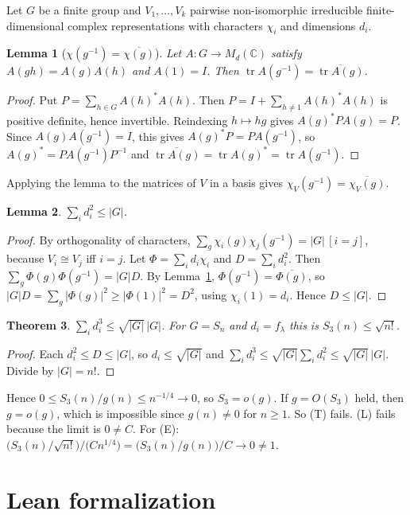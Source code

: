 \documentclass[11pt]{article}
\newtheorem{theorem}{Theorem}
\newtheorem{lemma}[theorem]{Lemma}
\theoremstyle{definition}
\newcommand{\tr}{\operatorname{tr}}
\begin{document}
Let $G$ be a finite group and $V_1,\dots,V_k$ pairwise non-isomorphic irreducible
finite-dimensional complex representations with characters $\chi_i$ and dimensions $d_i$.

\begin{lemma}[$\chi(g^{-1})=\overline{\chi(g)}$]\label{lem:conj}
Let $A:G\to M_d(\mathbb C)$ satisfy $A(gh)=A(g)A(h)$ and $A(1)=I$. Then
$\tr A(g^{-1})=\overline{\tr A(g)}$.
\end{lemma}
\begin{proof}
Put $P=\sum_{h\in G}A(h)^*A(h)$. Then $P=I+\sum_{h\ne1}A(h)^*A(h)$ is positive definite, hence
invertible. Reindexing $h\mapsto hg$ gives $A(g)^*PA(g)=P$. Since $A(g)A(g^{-1})=I$, this gives
$A(g)^*P=PA(g^{-1})$, so $A(g)^*=PA(g^{-1})P^{-1}$ and
$\overline{\tr A(g)}=\tr A(g)^*=\tr A(g^{-1})$.
\end{proof}
Applying the lemma to the matrices of $V$ in a basis gives $\chi_V(g^{-1})=\overline{\chi_V(g)}$.

\begin{lemma}\label{lem:bessel}
$\sum_i d_i^2\le|G|$.
\end{lemma}
\begin{proof}
By orthogonality of characters,
$\sum_{g}\chi_i(g)\chi_j(g^{-1})=|G|\,[i=j]$, because $V_i\cong V_j$ iff $i=j$. Let
$\Phi=\sum_i d_i\chi_i$ and $D=\sum_i d_i^2$. Then $\sum_g\Phi(g)\Phi(g^{-1})=|G|D$. By
Lemma~\ref{lem:conj}, $\Phi(g^{-1})=\overline{\Phi(g)}$, so
$|G|D=\sum_g|\Phi(g)|^2\ge|\Phi(1)|^2=D^2$, using $\chi_i(1)=d_i$. Hence $D\le|G|$.
\end{proof}

\begin{theorem}\label{thm:main}
$\sum_i d_i^3\le\sqrt{|G|}\,|G|$. For $G=S_n$ and $d_i=f_\lambda$ this is $S_3(n)\le\sqrt{n!}$.
\end{theorem}
\begin{proof}
Each $d_i^2\le D\le|G|$, so $d_i\le\sqrt{|G|}$ and $\sum_i d_i^3\le\sqrt{|G|}\sum_i d_i^2\le
\sqrt{|G|}\,|G|$. Divide by $|G|=n!$.
\end{proof}

Hence $0\le S_3(n)/g(n)\le n^{-1/4}\to0$, so $S_3=o(g)$. If $g=O(S_3)$ held, then $g=o(g)$, which
is impossible since $g(n)\ne0$ for $n\ge1$. So (T) fails. (L) fails because the limit is
$0\ne C$. For (E): $\bigl(S_3(n)/\sqrt{n!}\bigr)/\bigl(C n^{1/4}\bigr)=\bigl(S_3(n)/g(n)\bigr)/C\to
0\ne1$.

\section{Lean formalization}
\end{document}

